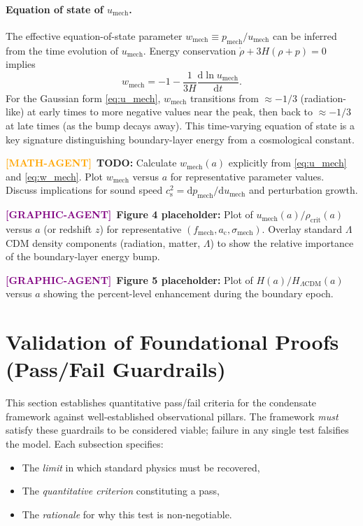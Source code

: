 \documentclass[11pt,a4paper]{article}
\newcommand{\dx}{\mathrm{d}}
\newcommand{\ac}{a_{\mathrm{c}}}
\newcommand{\cs}{c_{\mathrm{s}}}
\newcommand{\sigmamech}{\sigma_{\mathrm{mech}}}
\newcommand{\fmech}{f_{\mathrm{mech}}}
\newcommand{\umech}{u_{\mathrm{mech}}}
\newcommand{\rhocrit}{\rho_{\mathrm{crit}}}
\theoremstyle{definition}
\newcommand{\MATHAGENT}{\textcolor{orange}{\textbf{[MATH-AGENT]}}}
\newcommand{\GRAPHAGENT}{\textcolor{purple}{\textbf{[GRAPHIC-AGENT]}}}
\begin{document}
\paragraph{Equation of state of $\umech$.}
The effective equation-of-state parameter $w_{\mathrm{mech}} \equiv p_{\mathrm{mech}}/\umech$ can be inferred from the time evolution of $\umech$. Energy conservation $\dot{\rho} + 3H(\rho + p) = 0$ implies
\begin{equation}
\label{eq:w_mech}
w_{\mathrm{mech}} = -1 - \frac{1}{3H} \frac{\dx \ln \umech}{\dx t}.
\end{equation}
For the Gaussian form \eqref{eq:u_mech}, $w_{\mathrm{mech}}$ transitions from $\approx -1/3$ (radiation-like) at early times to more negative values near the peak, then back to $\approx -1/3$ at late times (as the bump decays away). This time-varying equation of state is a key signature distinguishing boundary-layer energy from a cosmological constant.

\MATHAGENT~\textbf{TODO:} Calculate $w_{\mathrm{mech}}(a)$ explicitly from \eqref{eq:u_mech} and \eqref{eq:w_mech}. Plot $w_{\mathrm{mech}}$ versus $a$ for representative parameter values. Discuss implications for sound speed $\cs^2 = \dx p_{\mathrm{mech}}/\dx \umech$ and perturbation growth.

\GRAPHAGENT~\textbf{Figure 4 placeholder:} Plot of $\umech(a)/\rhocrit(a)$ versus $a$ (or redshift $z$) for representative $(\fmech, \ac, \sigmamech)$. Overlay standard $\Lambda$CDM density components (radiation, matter, $\Lambda$) to show the relative importance of the boundary-layer energy bump.

\GRAPHAGENT~\textbf{Figure 5 placeholder:} Plot of $H(a)/H_{\Lambda\mathrm{CDM}}(a)$ versus $a$ showing the percent-level enhancement during the boundary epoch.

\section{Validation of Foundational Proofs (Pass/Fail Guardrails)}
\label{sec:validation}

This section establishes quantitative pass/fail criteria for the condensate framework against well-established observational pillars. The framework \emph{must} satisfy these guardrails to be considered viable; failure in any single test falsifies the model. Each subsection specifies:
\begin{itemize}[leftmargin=1.8em]
  \item The \emph{limit} in which standard physics must be recovered,
  \item The \emph{quantitative criterion} constituting a pass,
  \item The \emph{rationale} for why this test is non-negotiable.
\end{itemize}
\end{document}

